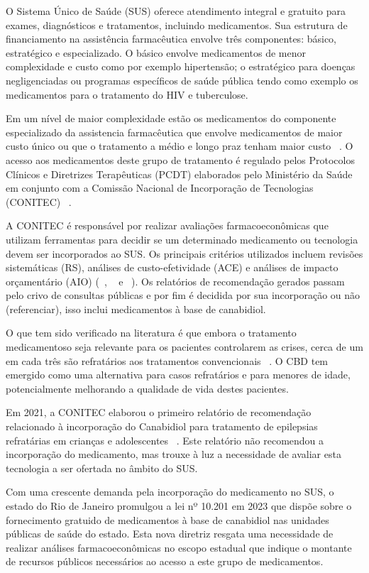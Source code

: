 \documentclass[article,a4paper,12pt,brazil,sumario=tradicional]{abntex2}
\begin{document}
O Sistema Único de Saúde (SUS) oferece atendimento integral e gratuito para exames, diagnósticos e tratamentos, incluindo medicamentos. Sua estrutura de financiamento na assistência farmacêutica envolve três componentes: básico, estratégico e especializado. O básico envolve medicamentos de menor complexidade e custo como por exemplo hipertensão; o estratégico para doenças negligenciadas ou programas específicos de saúde pública tendo como exemplo os medicamentos para o tratamento do HIV e tuberculose.

Em um nível de maior complexidade estão os medicamentos do componente especializado da assistencia farmacêutica que envolve medicamentos de maior custo único ou que o tratamento a médio e longo praz tenham maior custo ~\cite{portaria1554}. O acesso aos medicamentos deste grupo de tratamento é regulado pelos Protocolos Clínicos e Diretrizes Terapêuticas (PCDT) elaborados pelo Ministério da Saúde em conjunto com a Comissão Nacional de Incorporação de Tecnologias (CONITEC) ~\cite{lei12401}. 

A CONITEC é responsável por realizar avaliações farmacoeconômicas que utilizam ferramentas para decidir se um determinado medicamento ou tecnologia devem ser incorporados ao SUS. Os principais critérios utilizados incluem revisões sistemáticas (RS), análises de custo-efetividade (ACE) e análises de impacto orçamentário (AIO) (~\cite{revisoesRS}, ~\cite{analiseCE} e ~\cite{diretrizesAIO}). Os relatórios de recomendação gerados passam pelo crivo de consultas públicas e por fim é decidida por sua incorporação ou não (referenciar), isso inclui medicamentos à base de canabidiol.

O que tem sido verificado na literatura é que embora o tratamento medicamentoso seja relevante para os pacientes controlarem as crises, cerca de um em cada três são refratários aos tratamentos convencionais ~\cite{relatorioSociedadeConitec}. O CBD tem emergido como uma alternativa para casos refratários e para menores de idade, potencialmente melhorando a qualidade de vida destes pacientes.

Em 2021, a CONITEC elaborou o primeiro relatório de recomendação relacionado à incorporação do Canabidiol para tratamento de epilepsias refratárias em crianças e adolescentes ~\cite{recomencacaoConitec}. Este relatório não recomendou a incorporação do medicamento, mas trouxe à luz a necessidade de avaliar esta tecnologia a ser ofertada no âmbito do SUS.

Com uma crescente demanda pela incorporação do medicamento no SUS, o estado do Rio de Janeiro promulgou a lei nº 10.201 em 2023 que dispõe sobre o fornecimento gratuido de medicamentos à base de canabidiol nas unidades públicas de saúde do estado. Esta nova diretriz resgata uma necessidade de realizar análises farmacoeconômicas no escopo estadual que indique o montante de recursos públicos necessários ao acesso a este grupo de medicamentos.
\end{document}
